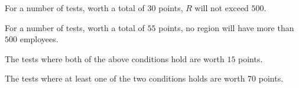 For a number of tests, worth a total of $30$ points, $R$ will not exceed $500$.

For a number of tests, worth a total of $55$ points, no region will have more than $500$ employees.

The tests where both of the above conditions hold are worth $15$ points.

The tests where at least one of the two conditions holds are worth $70$ points.